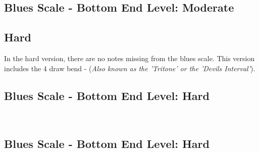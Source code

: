                 \subsection*{Blues Scale - Bottom End \Uparrow Level: Moderate}
                    \2\3\four\4
        
        
        \newpage    
            \subsection*{Hard}
            In the hard version, there are no notes missing from the blues scale.
            This version includes the 4 draw bend - (\textit{Also known as the 'Tritone' or the 'Devils Interval'}).
                \subsection*{Blues Scale - Bottom End \Downarrow Level: Hard}
                    \4\e\four\3\2 \\
                
                \subsection*{Blues Scale - Bottom End \Uparrow Level: Hard}
                    \2\3\four\e\4
            
        
    